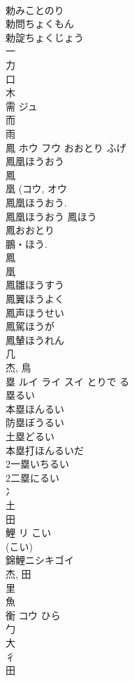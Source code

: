 \documentclass[8pt]{extreport}
\begin{document}
\begin{CJK}{UTF8}{min}
\\	勅みことのり
\\	勅問ちょくもん
\\	勅諚ちょくじょう
\\	一 
\\	力 
\\	口 
\\	木 
\\	需	ジュ		
\\	而 
\\	雨 
\\	鳳	ホウ フウ	おおとり ふげ	
\\	鳳凰ほうおう 
\\	鳳 
\\	凰 (コウ, オウ 
\\	鳳凰ほうおう. 
\\	鳳凰ほうおう 鳳ほう 
\\	鳳おおとり 
\\	鵬・ほう.
\\	鳳 
\\	凰 
\\	鳳雛ほうすう 
\\	鳳翼ほうよく 
\\	鳳声ほうせい 
\\	鳳駕ほうが 
\\	鳳輦ほうれん 
\\	几 
\\	杰, 鳥 
\\	塁	ルイ ライ スイ	とりで る	
\\	塁るい
\\	本塁ほんるい
\\	防塁ぼうるい
\\	土塁どるい
\\	本塁打ほんるいだ
\\	2一塁いちるい
\\	2二塁にるい
\\	冫 
\\	土 
\\	田 
\\	鯉	リ	こい	
\\	(こい) 
\\	錦鯉ニシキゴイ 
\\	杰, 田 
\\	里 
\\	魚 
\\	衡	コウ	ひら	
\\	勹 
\\	大 
\\	彳 
\\	田 

\end{CJK}
\end{document}
